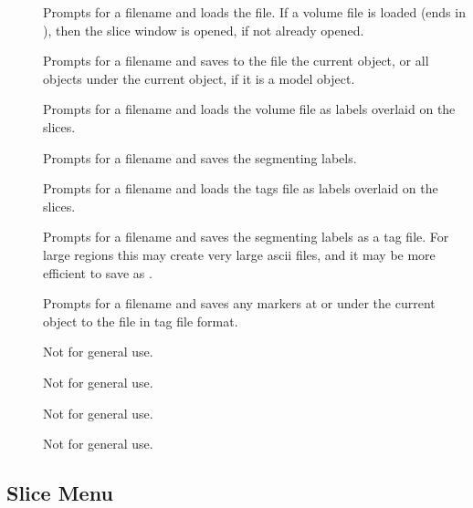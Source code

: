 \begin{description}
\item[]  Prompts for a filename and loads the file.
        If a volume file is loaded (ends in ), then the
        slice window is opened, if not already opened.
\item[]  Prompts for a filename and saves to the file
        the current object, or all objects under the current object, if it is
        a model object.
\item[]  Prompts for a filename and
        loads the volume file as labels overlaid on the slices.
\item[]  Prompts for a filename and
        saves the segmenting labels.
\item[]  Prompts for a filename and
        loads the tags file as labels overlaid on the slices.
\item[]  Prompts for a filename and
        saves the segmenting labels as a tag file.  For large regions
        this may create very large ascii files, and it may be more
        efficient to save as .
\item[]  Prompts for a filename and
        saves any markers at or under the current object to the file
        in tag file format.

\item[]  Not for general use.
\item[]  Not for general use.
\item[]  Not for general use.
\item[]  Not for general use.
\end{description}

\subsection{Slice Menu}

